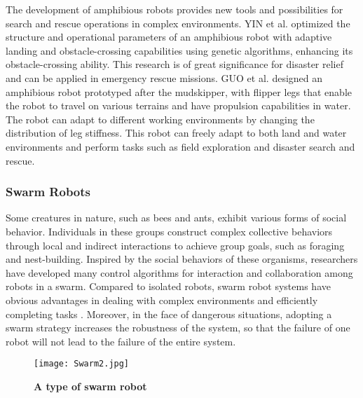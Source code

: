 \documentclass[conference]{IEEEtran}
\begin{document}
The development of amphibious robots provides new tools and possibilities for search and rescue operations in complex environments. YIN et al. \cite{b44} optimized the structure and operational parameters of an amphibious robot with adaptive landing and obstacle-crossing capabilities using genetic algorithms, enhancing its obstacle-crossing ability. This research is of great significance for disaster relief and can be applied in emergency rescue missions. GUO et al.\cite{b45} designed an amphibious robot prototyped after the mudskipper, with flipper legs that enable the robot to travel on various terrains and have propulsion capabilities in water. The robot can adapt to different working environments by changing the distribution of leg stiffness. This robot can freely adapt to both land and water environments and perform tasks such as field exploration and disaster search and rescue.

\subsubsection{Swarm Robots}
Some creatures in nature, such as bees and ants, exhibit various forms of social behavior. Individuals in these groups construct complex collective behaviors through local and indirect interactions to achieve group goals, such as foraging and nest-building. Inspired by the social behaviors of these organisms, researchers have developed many control algorithms for interaction and collaboration among robots in a swarm. Compared to isolated robots, swarm robot systems have obvious advantages in dealing with complex environments and efficiently completing tasks \cite{b46}. Moreover, in the face of dangerous situations, adopting a swarm strategy increases the robustness of the system, so that the failure of one robot will not lead to the failure of the entire system.

\begin{figure}[h]
    \centering
    \texttt{[image: Swarm2.jpg]}
    \caption{\textbf{A type of swarm robot}}
    \label{fig:enter-label}
\end{figure}
\end{document}
